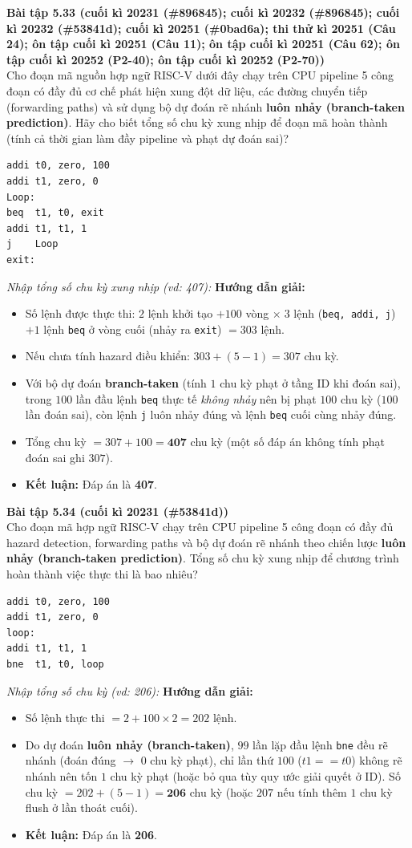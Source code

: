\textbf{Bài tập 5.33 (cuối kì 20231 (\#896845); cuối kì 20232 (\#896845); cuối kì 20232 (\#53841d); cuối kì 20251 (\#0bad6a); thi thử kì 20251 (Câu 24); ôn tập cuối kì 20251 (Câu 11); ôn tập cuối kì 20251 (Câu 62); ôn tập cuối kì 20252 (P2-40); ôn tập cuối kì 20252 (P2-70))}\\
Cho đoạn mã nguồn hợp ngữ RISC-V dưới đây chạy trên CPU pipeline 5 công đoạn có đầy đủ cơ chế phát hiện xung đột dữ liệu, các đường chuyển tiếp (forwarding paths) và sử dụng bộ dự đoán rẽ nhánh \textbf{luôn nhảy (branch-taken prediction)}. Hãy cho biết tổng số chu kỳ xung nhịp để đoạn mã hoàn thành (tính cả thời gian làm đầy pipeline và phạt dự đoán sai)?
\begin{lstlisting}
addi t0, zero, 100
addi t1, zero, 0
Loop:
beq  t1, t0, exit
addi t1, t1, 1
j    Loop
exit:
\end{lstlisting}
\textit{Nhập tổng số chu kỳ xung nhịp (vd: 407):}
\textbf{Hướng dẫn giải:}
\begin{itemize}
    \item Số lệnh được thực thi: $2$ lệnh khởi tạo $+ 100$ vòng $\times\; 3$ lệnh (\texttt{beq, addi, j}) $+ 1$ lệnh \texttt{beq} ở vòng cuối (nhảy ra \texttt{exit}) $= 303$ lệnh.
    \item Nếu chưa tính hazard điều khiển: $303 + (5 - 1) = 307$ chu kỳ.
    \item Với bộ dự đoán \textbf{branch-taken} (tính $1$ chu kỳ phạt ở tầng ID khi đoán sai), trong $100$ lần đầu lệnh \texttt{beq} thực tế \textit{không nhảy} nên bị phạt $100$ chu kỳ ($100$ lần đoán sai), còn lệnh \texttt{j} luôn nhảy đúng và lệnh \texttt{beq} cuối cùng nhảy đúng.
    \item Tổng chu kỳ $= 307 + 100 = \mathbf{407}$ chu kỳ (một số đáp án không tính phạt đoán sai ghi $307$).
    \item \textbf{Kết luận:} Đáp án là \textbf{407}.
\end{itemize}

\textbf{Bài tập 5.34 (cuối kì 20231 (\#53841d))}\\
Cho đoạn mã hợp ngữ RISC-V chạy trên CPU pipeline 5 công đoạn có đầy đủ hazard detection, forwarding paths và bộ dự đoán rẽ nhánh theo chiến lược \textbf{luôn nhảy (branch-taken prediction)}. Tổng số chu kỳ xung nhịp để chương trình hoàn thành việc thực thi là bao nhiêu?
\begin{lstlisting}
addi t0, zero, 100
addi t1, zero, 0
loop:
addi t1, t1, 1
bne  t1, t0, loop
\end{lstlisting}
\textit{Nhập tổng số chu kỳ (vd: 206):}
\textbf{Hướng dẫn giải:}
\begin{itemize}
    \item Số lệnh thực thi $= 2 + 100 \times 2 = 202$ lệnh.
    \item Do dự đoán \textbf{luôn nhảy (branch-taken)}, $99$ lần lặp đầu lệnh \texttt{bne} đều rẽ nhánh (đoán đúng $\rightarrow$ $0$ chu kỳ phạt), chỉ lần thứ $100$ ($t1 == t0$) không rẽ nhánh nên tốn $1$ chu kỳ phạt (hoặc bỏ qua tùy quy ước giải quyết ở ID). Số chu kỳ $= 202 + (5 - 1) = \mathbf{206}$ chu kỳ (hoặc $207$ nếu tính thêm $1$ chu kỳ flush ở lần thoát cuối).
    \item \textbf{Kết luận:} Đáp án là \textbf{206}.
\end{itemize}
